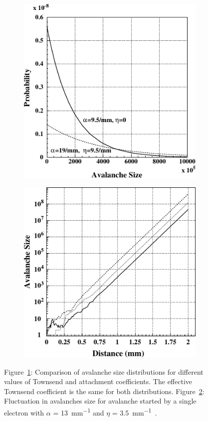 	\begin{figure}[H]
		\begin{subfigure}{0.5\linewidth}
			\centering
			\includegraphics[width = 0.5\plotwidth]{fig/chapt4/Riegler-distrib.pdf}
			\caption{\label{fig:RVL:A}}
		\end{subfigure}
		\begin{subfigure}{0.5\linewidth}
			\centering
			\includegraphics[width = 0.5\plotwidth]{fig/chapt4/Riegler-fluctuations.pdf}
			\caption{\label{fig:RVL:B}}
		\end{subfigure}
		\caption{\label{fig:RVL} Figure~\ref{fig:RVL:A}: Comparison of avalanche size distributions for different values of Townsend and attachment coefficients. The effective Townsend coefficient is the same for both distributions. Figure~\ref{fig:RVL:B}: Fluctuation in avalanches size for avalanche started by a single electron with $\alpha$ = \SI{13}{mm^{-1}} and $\eta$ = \SI{3.5}{mm^{-1}}~\cite{RIEGLER2003}.}
	\end{figure}
		
